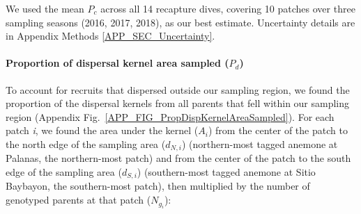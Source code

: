\documentclass[12pt, oneside]{article}   	%
\begin{document}
We used the mean $P_c$ across all 14 recapture dives, covering 10 patches over three sampling seasons (2016, 2017, 2018), as our best estimate. Uncertainty details are in Appendix Methods \ref{APP_SEC_Uncertainty}.




\paragraph*{Proportion of dispersal kernel area sampled ($P_d$)} %

To account for recruits that dispersed outside our sampling region, we found the proportion of the dispersal kernels from all parents that fell within our sampling region (Appendix Fig.\ \ref{APP_FIG_PropDispKernelAreaSampled}). For each patch \textit{i}, we found the area under the kernel ($A_i$) from the center of the patch to the north edge of the sampling area ($d_{N,i}$) (northern-most tagged anemone at Palanas, the northern-most patch) and from the center of the patch to the south edge of the sampling area ($d_{S,i}$) (southern-most tagged anemone at Sitio Baybayon, the southern-most patch), then multiplied by the number of genotyped parents at that patch ($N_{g_i}$):
\end{document}

